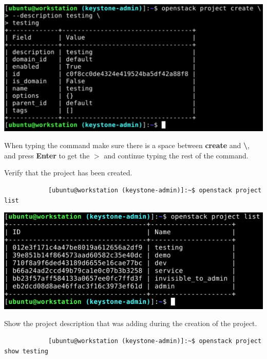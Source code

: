 \documentclass[letterpaper, 12pt]{article}
\begin{document}
\begin{enumerate}
\begin{labstep}
        \begin{center}
            \includegraphics[width=\linewidth]{images/part2/step6.png}
        \end{center}
    \end{labstep}

    \begin{tipbox}
        When typing the command make sure there is a space between \textbf{create} and \textbf{\textbackslash}, and press \textbf{Enter} to get the \textbf{$>$} and continue typing the rest of the command.
    \end{tipbox}

    \begin{labstep}
        Verify that the project has been created.
        \begin{lstlisting}
            [ubuntu@workstation (keystone-admin)]:~$ openstack project list
        \end{lstlisting}

        \begin{center}
            \includegraphics[width=\linewidth]{images/part2/step7.png}
        \end{center}
    \end{labstep}

    \begin{labstep}
        Show the project description that was adding during the creation of the project.
        \begin{lstlisting}
            [ubuntu@workstation (keystone-admin)]:~$ openstack project show testing
        \end{lstlisting}


\end{labstep}
\end{enumerate}
\end{document}
